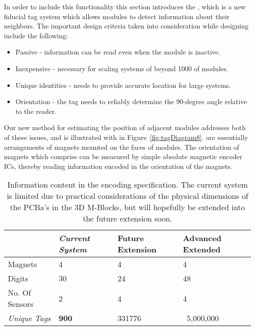 In order to include this functionality this section introduces the \TagNamePlural, which is a new fiducial tag system which allows modules to detect information about their neighbors. The important design criteria taken into consideration while designing \TagNamePlural include the following:
\begin{itemize}
	\item Passive - information can be read even when the module is inactive.
	\item Inexpensive - necessary for scaling systems of beyond 1000 of modules.
	\item Unique identities - needs to provide accurate location for large systems.
	\item Orientation - the tag needs to reliably determine the 90-degree angle relative to the reader.
\end{itemize} 

Our new method for estimating the position of adjacent modules addresses both of these issues, and is illustrated with in Figure~\ref{fig:tagDiagram8}. \TagNamePlural are essentially arrangements of magnets mounted on the faces of modules.  The orientation of magnets which comprise \tagNamePlural can be measured by simple absolute magnetic encoder ICs, thereby reading information encoded in the orientation of the magnets.

\begin{table}[b]
	\caption{Information content in the \TagNamePlural encoding specification. The current system is limited due to practical considerations of the physical dimensions of the  PCBa's in the 3D M-Blocks, but will hopefully be extended into the future extension soon.}
	
	\begin{tabular}{ p{2cm}  p{1.5cm}  p{1.5cm}  p{1.5cm}}
		\hline
								& \textit{Current System} & Future Extension & Advanced Extended \\
		\hline
				\addlinespace[1ex]
		Magnets  				& 4 			 &	4				&	4	\\
		Digits 					& 30 			 &	24				&	48	\\
		No. Of Sensors 			& 2 			 &	4				&	4	\\
		\textit{Unique Tags} 	& \textbf{900} 	 & 331776			& 	~5,000,000\\
		
	\end{tabular}
	
	\label{tab:hardwareOverview}
\end{table}

